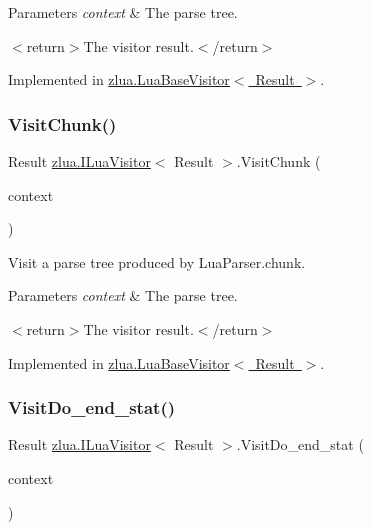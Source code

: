 \begin{DoxyParams}{Parameters}
{\em context} & The parse tree.\\
\hline
\end{DoxyParams}
$<$return$>$The visitor result.$<$/return$>$ 

Implemented in \mbox{\hyperlink{classzlua_1_1_lua_base_visitor_a0e906bc61ad12590e152305e36f80b27}{zlua.\+Lua\+Base\+Visitor$<$ Result $>$}}.

\mbox{\label{interfacezlua_1_1_i_lua_visitor_a48ac01ae4a56895145eb63223a511cdf}} 
\subsubsection{\texorpdfstring{Visit\+Chunk()}{VisitChunk()}}
{\footnotesize\ttfamily Result \mbox{\hyperlink{interfacezlua_1_1_i_lua_visitor}{zlua.\+I\+Lua\+Visitor}}$<$ Result $>$.Visit\+Chunk (\begin{DoxyParamCaption}\item[{\mbox{[}\+Not\+Null\mbox{]} \mbox{\hyperlink{classzlua_1_1_lua_parser_1_1_chunk_context}{Lua\+Parser.\+Chunk\+Context}}}]{context }\end{DoxyParamCaption})}



Visit a parse tree produced by Lua\+Parser.\+chunk. 


\begin{DoxyParams}{Parameters}
{\em context} & The parse tree.\\
\hline
\end{DoxyParams}
$<$return$>$The visitor result.$<$/return$>$ 

Implemented in \mbox{\hyperlink{classzlua_1_1_lua_base_visitor_a9d1632ababc782344ac2324282dab1e3}{zlua.\+Lua\+Base\+Visitor$<$ Result $>$}}.

\mbox{\label{interfacezlua_1_1_i_lua_visitor_a0bffd1ec59b6a27546f19006974cd6c1}} 
\subsubsection{\texorpdfstring{Visit\+Do\+\_\+end\+\_\+stat()}{VisitDo\_end\_stat()}}
{\footnotesize\ttfamily Result \mbox{\hyperlink{interfacezlua_1_1_i_lua_visitor}{zlua.\+I\+Lua\+Visitor}}$<$ Result $>$.Visit\+Do\+\_\+end\+\_\+stat (\begin{DoxyParamCaption}\item[{\mbox{[}\+Not\+Null\mbox{]} \mbox{\hyperlink{classzlua_1_1_lua_parser_1_1_do__end__stat_context}{Lua\+Parser.\+Do\+\_\+end\+\_\+stat\+Context}}}]{context }\end{DoxyParamCaption})}



